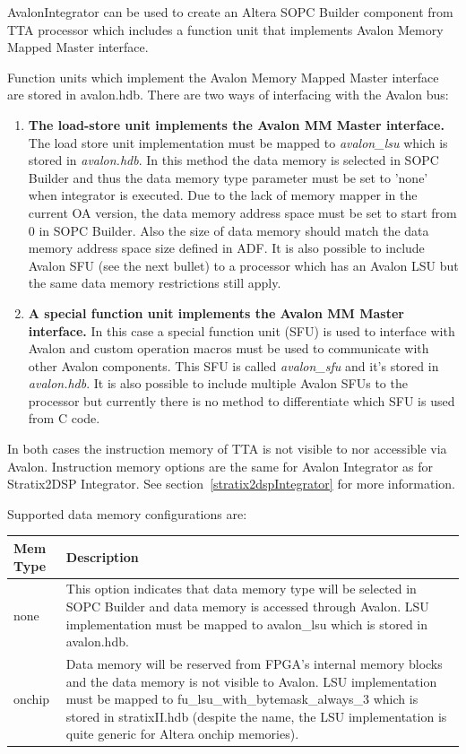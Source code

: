 \documentclass[a4paper,twoside]{tceusermanual}
\begin{document}
AvalonIntegrator can be used to create an Altera SOPC Builder component from
TTA processor which includes a function unit that implements Avalon Memory
Mapped Master interface.

Function units which implement the Avalon Memory Mapped Master interface are stored
in avalon.hdb. There are two ways of interfacing with the Avalon bus:

\begin{enumerate}
 \item \textbf{The load-store unit implements the Avalon MM Master interface.} 
The load store unit implementation must be mapped to \textit{avalon\_lsu} which is 
stored in \textit{avalon.hdb}. In this method the data memory is selected in SOPC Builder and thus
the data memory type parameter must be set to 'none' when integrator is
executed. Due to the lack of memory mapper in the current OA version, 
the data memory address space must be set to start from 0 in SOPC Builder. Also the size of
data memory should match the data memory address space size defined in ADF.
It is also possible to include Avalon SFU (see the next bullet) to a processor
which has an Avalon LSU but the same data memory restrictions still apply.

 \item \textbf{A special function unit implements the Avalon MM Master interface.}
In this case a special function unit (SFU) is used to interface with Avalon and
custom operation macros must be used to communicate with other Avalon components.
This SFU is called \textit{avalon\_sfu} and it's stored in \textit{avalon.hdb}.
It is also possible to include multiple Avalon SFUs to the processor but
currently there is no method to differentiate which SFU is used from C code.


\end{enumerate}

In both cases the instruction memory of TTA is not visible to nor accessible
via Avalon. Instruction memory options are the same for Avalon Integrator as
for Stratix2DSP Integrator. See section~\ref{stratix2dspIntegrator} for more
information.

Supported data memory configurations are:
\begin{center}
\begin{longtable}[htb]{@{}p{}%
                     @{}p{}}

\textbf{Mem Type} &\textbf{Description} \\
\hline
none & This option indicates that data memory type will be selected in SOPC
Builder and data memory is accessed through Avalon. LSU implementation must
be mapped to avalon\_lsu which is stored in avalon.hdb.\\
onchip & Data memory will be reserved from FPGA's internal memory blocks and
the data memory is not visible to Avalon. LSU implementation must be mapped to
fu\_lsu\_with\_bytemask\_always\_3 which is stored in stratixII.hdb (despite
the name, the LSU implementation is quite generic for Altera onchip memories).
\end{longtable}
\end{center}
\end{document}
